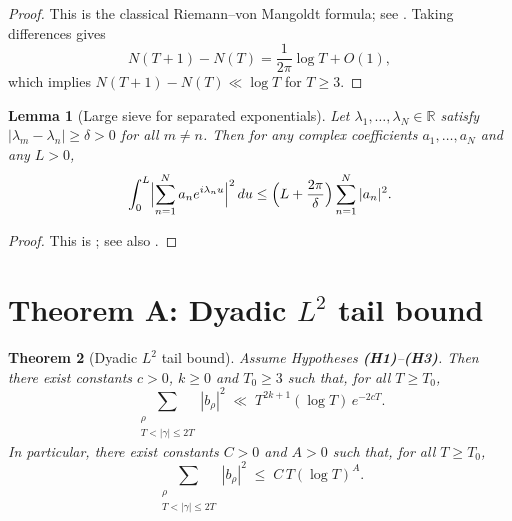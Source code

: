 \documentclass[11pt]{article}
\theoremstyle{plain}
\newtheorem{theorem}{Theorem}[section]
\newtheorem{lemma}[theorem]{Lemma}
\theoremstyle{definition}
\begin{document}
\begin{proof}
This is the classical Riemann--von Mangoldt formula; see \cite[Ch.\ 9]{Titchmarsh}. Taking differences gives
\[
  N(T+1)-N(T)
  = \frac{1}{2\pi}\log T + O(1),
\]
which implies $N(T+1)-N(T)\ll \log T$ for $T\ge 3$.
\end{proof}

\begin{lemma}[Large sieve for separated exponentials]\label{lem:largesieve}
Let $\lambda_1,\dots,\lambda_N\in\mathbb{R}$ satisfy $|\lambda_m-\lambda_n|\ge \delta>0$ for all $m\neq n$. Then for any complex coefficients $a_1,\dots,a_N$ and any $L>0$,
\[
  \int_0^L \Bigl|\sum_{n=1}^N a_n e^{i\lambda_n u}\Bigr|^2\,du
  \le \Bigl(L+\frac{2\pi}{\delta}\Bigr)\sum_{n=1}^N |a_n|^2.
\]
\end{lemma}
\begin{proof}
This is \cite[Theorem~1.3]{MontgomeryLNM227}; see also \cite[Ch.\ 7]{MontgomeryVaughan}.
\end{proof}

\section{Theorem A: Dyadic \texorpdfstring{$L^2$}{L2} tail bound}
\begin{theorem}[Dyadic $L^2$ tail bound]\label{thm:A}
Assume Hypotheses \textbf{(H1)}--\textbf{(H3)}. Then there exist constants $c>0$, $k\ge 0$ and $T_0\ge 3$ such that, for all $T\ge T_0$,
\begin{equation}\label{eq:thmA-exp}
  \sum_{\substack{\rho \\ T < |\gamma| \le 2T}} |b_\rho|^2
  \;\ll\; T^{2k+1}(\log T)\,e^{-2cT}.
\end{equation}
In particular, there exist constants $C>0$ and $A>0$ such that, for all $T\ge T_0$,
\[
  \sum_{\substack{\rho \\ T < |\gamma| \le 2T}} |b_\rho|^2 \;\le\; C\,T(\log T)^A.
\]
\end{theorem}
\end{document}

